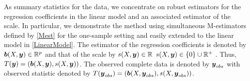 \documentclass[12pt]{article}
\def\bth{\mbox{\boldmath $\theta$}}
\def\bbeta{\mbox{\boldmath $\beta$}}
\newcommand{\by}{\mbox{\boldmath $y$}}
\newcommand{\bb}{\mbox{\boldmath $b$}}
\newcommand{\green}[1]{{\color{green}#1}}
\DeclareMathOperator*{\argmin}{\arg\!\min}
\begin{document}
As summary statistics for the data, we concentrate on robust estimators for the 
\green{regression} coefficients in the linear model and an associated 
estimator of the scale. In particular, we demonstrate the method using simultaneous M-estimators defined by \eqref{Mest} for the one-sample setting and easily extended to the linear model in \eqref{LinearModel}. The estimator of the \green{regression} coefficients is denoted by $\bb(X, \by)\in \mathbb R^{p}$ and that of the scale by \green{\sout{$s(X, \by)\in \mathbb R$} $s(X, \by)\in \{0\} \cup {\mathbb R}^+$} . Thus, $T(\by)=(\bb(X, \by), s(X, \by))$. The observed complete data is denoted by $\by_{obs}$ with observed statistic  denoted by $T(\by_{obs})=(\bb(X, \by_{obs}), s(X, \by_{obs}))$. %

\end{document}
